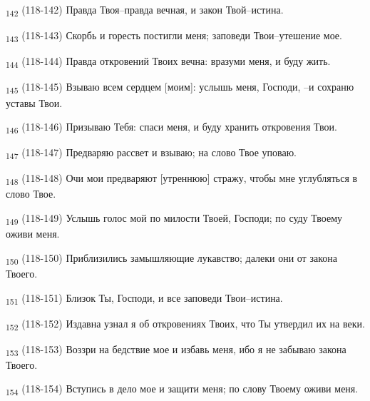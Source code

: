 \begin{tcolorbox}
\textsubscript{142} (118-142) Правда Твоя--правда вечная, и закон Твой--истина.
\end{tcolorbox}
\begin{tcolorbox}
\textsubscript{143} (118-143) Скорбь и горесть постигли меня; заповеди Твои--утешение мое.
\end{tcolorbox}
\begin{tcolorbox}
\textsubscript{144} (118-144) Правда откровений Твоих вечна: вразуми меня, и буду жить.
\end{tcolorbox}
\begin{tcolorbox}
\textsubscript{145} (118-145) Взываю всем сердцем [моим]: услышь меня, Господи, --и сохраню уставы Твои.
\end{tcolorbox}
\begin{tcolorbox}
\textsubscript{146} (118-146) Призываю Тебя: спаси меня, и буду хранить откровения Твои.
\end{tcolorbox}
\begin{tcolorbox}
\textsubscript{147} (118-147) Предваряю рассвет и взываю; на слово Твое уповаю.
\end{tcolorbox}
\begin{tcolorbox}
\textsubscript{148} (118-148) Очи мои предваряют [утреннюю] стражу, чтобы мне углубляться в слово Твое.
\end{tcolorbox}
\begin{tcolorbox}
\textsubscript{149} (118-149) Услышь голос мой по милости Твоей, Господи; по суду Твоему оживи меня.
\end{tcolorbox}
\begin{tcolorbox}
\textsubscript{150} (118-150) Приблизились замышляющие лукавство; далеки они от закона Твоего.
\end{tcolorbox}
\begin{tcolorbox}
\textsubscript{151} (118-151) Близок Ты, Господи, и все заповеди Твои--истина.
\end{tcolorbox}
\begin{tcolorbox}
\textsubscript{152} (118-152) Издавна узнал я об откровениях Твоих, что Ты утвердил их на веки.
\end{tcolorbox}
\begin{tcolorbox}
\textsubscript{153} (118-153) Воззри на бедствие мое и избавь меня, ибо я не забываю закона Твоего.
\end{tcolorbox}
\begin{tcolorbox}
\textsubscript{154} (118-154) Вступись в дело мое и защити меня; по слову Твоему оживи меня.
\end{tcolorbox}
